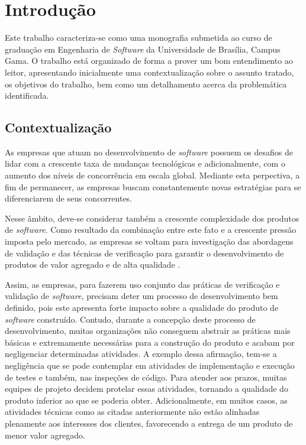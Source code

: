 \chapter{Introdução}

Este trabalho caracteriza-se como uma monografia submetida ao curso de graduação em Engenharia de \textit{Software} da Universidade de Brasília, Campus Gama. O trabalho está organizado de forma a prover um bom entendimento ao leitor, apresentando inicialmente uma contextualização sobre o assunto tratado, os objetivos do trabalho, bem como um detalhamento acerca da problemática identificada.

\section{Contextualização}

As empresas que atuam no desenvolvimento de \textit{software} possuem os desafios de lidar com a crescente taxa de mudanças tecnológicas e adicionalmente, com o aumento dos níveis de concorrência em escala global. Mediante esta perpectiva, a fim de permanecer, as empresas buscam constantemente novas estratégias para se diferenciarem de seus concorrentes.

Nesse âmbito, deve-se considerar também a crescente complexidade dos produtos de \textit{software}. Como resultado da combinação entre este fato e a crescente pressão imposta pelo mercado, as empresas se voltam para investigação das abordagens de validação e das técnicas de verificação para garantir o desenvolvimento de produtos de valor agregado e de alta qualidade \cite{vbse1}.

Assim, as empresas, para fazerem uso conjunto das práticas de verificação e validação de \textit{software}, precisam deter um processo de desenvolvimento bem definido, pois este apresenta forte impacto sobre a qualidade do produto de \textit{software} construído. Contudo, durante a concepção deste processo de desenvolvimento, muitas organizações não conseguem abstrair as práticas mais básicas e extremamente necessárias para a construção do produto e acabam por negligenciar determinadas atividades. A exemplo dessa afirmação, tem-se a negligência que se pode contemplar em atividades de implementação e execução de testes e também, nas inspeções de código. Para atender aos prazos, muitas equipes de projeto decidem protelar essas atividades, tornando a qualidade do produto inferior ao que se poderia obter. Adicionalmente, em muitos casos, as atividades técnicas como as citadas anteriormente não estão alinhadas plenamente aos interesses dos clientes, favorecendo a entrega de um produto de menor valor agregado.

